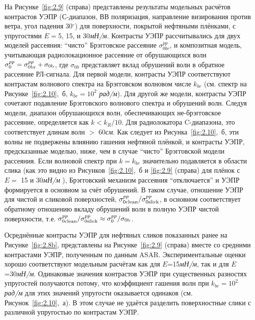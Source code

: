 На Рисунке~\ref{fig:2.9} (справа) представлены результаты модельных расчётов контрастов УЭПР (С-диапазон, ВВ поляризация, направление визирования против ветра, угол падения 30${}^\circ$) для поверхности, покрытой нефтяными плёнками, с упругостями $E=$5, 15, и 30\textit{мН/м.} Контрасты УЭПР рассчитывались для двух моделей рассеяния: ``чисто'' Брэгговское рассеяние ${\sigma}_{0{br}}^{pp}$, и композитная модель, учитывающая радиолокационное рассеяние от обрушающихся волн ${\rm \sigma }_{0}^{pp} ={\rm \sigma }_{0{\rm br}}^{pp} +{\rm \sigma }_{0{\rm b}} $, где $\sigma _{0b} $ представляет вклад обрушений волн в обратное рассеяние РЛ-сигнала. Для первой модели, контрасты УЭПР соответствуют контрастам волнового спектра на Брэгговском волновом числе $k_{br} $ (см. спектр на Рисунке~\ref{fig:2.10},~б, $k_{br} =10^{2}$ \textit{рад/м}). Для другой же модели, контрасты УЭПР сочетают подавление Брэгговского волнового спектра и обрушений волн. Следуя модели, диапазон обрушающихся волн, обеспечивающих не-брэгговское рассеяние, определяется как $k<k_{R} /10$. Для радиолокатора C-диапазона, это соответствует длинам волн $>$ 60\textit{см}. Как следует из Рисунка~\ref{fig:2.10},~б, эти волны не подвержены влиянию гашения нефтяной плёнкой, и контрасты УЭПР, предсказанные моделью, ниже, чем в случае ``чисто'' Брэгговской модели рассеяния. Если волновой спектр при $k=k_{br} $ значительно подавляется в области слика (как это видно из Рисунков~\ref{fig:2.10},~б и \ref{fig:2.9} (справа) для плёнок с $E=$ 15 и 30\textit{мН/м }), Брэгговский механизм рассеяния ``отключается'' и УЭПР формируется в основном за счёт обрушений. В таком случае, отношение УЭПР для чистой и сликовой поверхностей, ${\rm \sigma }_{0{\rm clean}}^{pp} /{\rm \sigma }_{0{\rm slick}}^{pp} $, в основном соответствует обратному отношению вкладу обрушений волн в полную УЭПР чистой поверхности, т.е. ${\rm \sigma }_{0{\rm clean}}^{pp} /{\rm \sigma }_{0{\rm slick}}^{pp} \approx {\rm \sigma }_{0}^{pp} /{\rm \sigma }_{0{\rm b}} $.

Осреднённые контрасты УЭПР для нефтяных сликов показанных ранее на Рисунке~\ref{fig:2.8b}, представлены на Рисунке~\ref{fig:2.9} (справа) вместе со средними контрастами УЭПР, полученным по данным ASAR. Экспериментальные оценки хорошо соответствуют модельным расчётам как для $E$=15\textit{мН/м}, так и для $E$=30\textit{мН/м}. Одинаковые значения контрастов УЭПР при существенных разностях упругостей получаются потому, что коэффициент гашения волн при $k_{br} =10^{2}$\textit{рад/м} для этих значений упругости оказывается одинаков (см. Рисунок~\ref{fig:2.10},~а). В этом случае не удаётся разделить поверхностные слики с различной упругостью по контрастам УЭПР.

